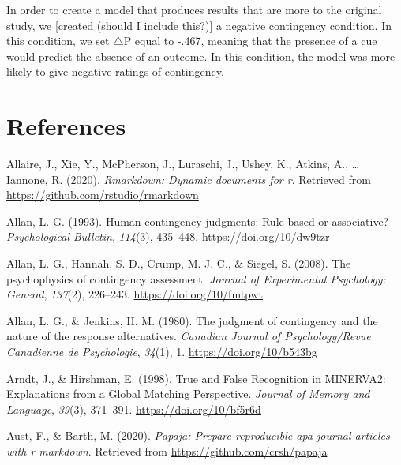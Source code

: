 \documentclass[
  english,
  man,floatsintext]{apa6}
\begin{document}
In order to create a model that produces results that are more to the original study, we {[}created (should I include this?){]} a negative contingency condition. In this condition, we set \(\triangle\)P equal to -.467, meaning that the presence of a cue would predict the absence of an outcome. In this condition, the model was more likely to give negative ratings of contingency.

\newpage

\hypertarget{references}{%
\section{References}\label{references}}

\begingroup
\setlength{\parindent}{-0.5in}
\setlength{\leftskip}{0.5in}

\hypertarget{refs}{}
\leavevmode\hypertarget{ref-R-rmarkdown}{}%
Allaire, J., Xie, Y., McPherson, J., Luraschi, J., Ushey, K., Atkins, A., \ldots{} Iannone, R. (2020). \emph{Rmarkdown: Dynamic documents for r}. Retrieved from \url{https://github.com/rstudio/rmarkdown}

\leavevmode\hypertarget{ref-allanHumanContingencyJudgments1993}{}%
Allan, L. G. (1993). Human contingency judgments: Rule based or associative? \emph{Psychological Bulletin}, \emph{114}(3), 435--448. \url{https://doi.org/10/dw9tzr}

\leavevmode\hypertarget{ref-allanPsychophysicsContingencyAssessment2008}{}%
Allan, L. G., Hannah, S. D., Crump, M. J. C., \& Siegel, S. (2008). The psychophysics of contingency assessment. \emph{Journal of Experimental Psychology: General}, \emph{137}(2), 226--243. \url{https://doi.org/10/fmtpwt}

\leavevmode\hypertarget{ref-allanJudgmentContingencyNature1980}{}%
Allan, L. G., \& Jenkins, H. M. (1980). The judgment of contingency and the nature of the response alternatives. \emph{Canadian Journal of Psychology/Revue Canadienne de Psychologie}, \emph{34}(1), 1. \url{https://doi.org/10/b543bg}

\leavevmode\hypertarget{ref-arndtTrueFalseRecognition1998}{}%
Arndt, J., \& Hirshman, E. (1998). True and False Recognition in MINERVA2: Explanations from a Global Matching Perspective. \emph{Journal of Memory and Language}, \emph{39}(3), 371--391. \url{https://doi.org/10/bf5r6d}

\leavevmode\hypertarget{ref-R-papaja}{}%
Aust, F., \& Barth, M. (2020). \emph{Papaja: Prepare reproducible apa journal articles with r markdown}. Retrieved from \url{https://github.com/crsh/papaja}
\end{document}
